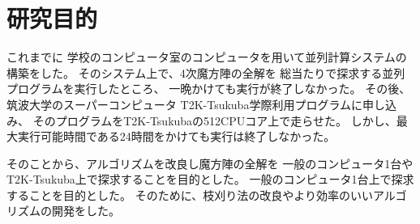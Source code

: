 \section{研究目的}
これまでに
学校のコンピュータ室のコンピュータを用いて並列計算システムの構築をした。
そのシステム上で、4次魔方陣の全解を
総当たりで探求する並列プログラムを実行したところ、
一晩かけても実行が終了しなかった。
その後、筑波大学のスーパーコンピュータ
T2K-Tsukuba学際利用プログラムに申し込み、
そのプログラムをT2K-Tsukubaの512CPUコア上で走らせた。
しかし、最大実行可能時間である24時間をかけても実行は終了しなかった。

そのことから、アルゴリズムを改良し魔方陣の全解を
一般のコンピュータ1台やT2K-Tsukuba上で探求することを目的とした。
一般のコンピュータ1台上で探求することを目的とした。
そのために、枝刈り法の改良やより効率のいいアルゴリズムの開発をした。
